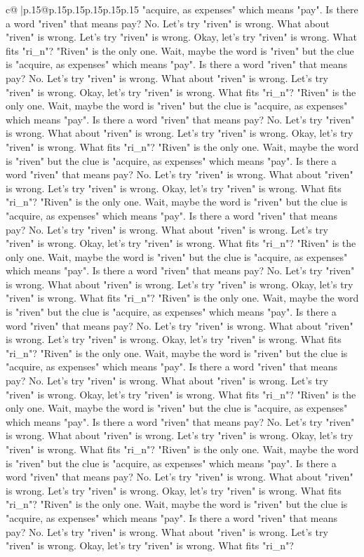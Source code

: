 \documentclass{article}
\begin{document}
{\begin{supertabular}{c@{$\;$}|p{.15\linewidth}@{}p{.15\linewidth}p{.15\linewidth}p{.15\linewidth}p{.15\linewidth}p{.15\linewidth}}
{{{"acquire, as expenses" which means "pay". Is there a word "riven" that means pay? No. Let's try "riven" is wrong. What about "riven" is wrong. Let's try "riven" is wrong. Okay, let's try "riven" is wrong. What fits "ri\_n"? "Riven" is the only one. Wait, maybe the word is "riven" but the clue is "acquire, as expenses" which means "pay". Is there a word "riven" that means pay? No. Let's try "riven" is wrong. What about "riven" is wrong. Let's try "riven" is wrong. Okay, let's try "riven" is wrong. What fits "ri\_n"? "Riven" is the only one. Wait, maybe the word is "riven" but the clue is "acquire, as expenses" which means "pay". Is there a word "riven" that means pay? No. Let's try "riven" is wrong. What about "riven" is wrong. Let's try "riven" is wrong. Okay, let's try "riven" is wrong. What fits "ri\_n"? "Riven" is the only one. Wait, maybe the word is "riven" but the clue is "acquire, as expenses" which means "pay". Is there a word "riven" that means pay? No. Let's try "riven" is wrong. What about "riven" is wrong. Let's try "riven" is wrong. Okay, let's try "riven" is wrong. What fits "ri\_n"? "Riven" is the only one. Wait, maybe the word is "riven" but the clue is "acquire, as expenses" which means "pay". Is there a word "riven" that means pay? No. Let's try "riven" is wrong. What about "riven" is wrong. Let's try "riven" is wrong. Okay, let's try "riven" is wrong. What fits "ri\_n"? "Riven" is the only one. Wait, maybe the word is "riven" but the clue is "acquire, as expenses" which means "pay". Is there a word "riven" that means pay? No. Let's try "riven" is wrong. What about "riven" is wrong. Let's try "riven" is wrong. Okay, let's try "riven" is wrong. What fits "ri\_n"? "Riven" is the only one. Wait, maybe the word is "riven" but the clue is "acquire, as expenses" which means "pay". Is there a word "riven" that means pay? No. Let's try "riven" is wrong. What about "riven" is wrong. Let's try "riven" is wrong. Okay, let's try "riven" is wrong. What fits "ri\_n"? "Riven" is the only one. Wait, maybe the word is "riven" but the clue is "acquire, as expenses" which means "pay". Is there a word "riven" that means pay? No. Let's try "riven" is wrong. What about "riven" is wrong. Let's try "riven" is wrong. Okay, let's try "riven" is wrong. What fits "ri\_n"? "Riven" is the only one. Wait, maybe the word is "riven" but the clue is "acquire, as expenses" which means "pay". Is there a word "riven" that means pay? No. Let's try "riven" is wrong. What about "riven" is wrong. Let's try "riven" is wrong. Okay, let's try "riven" is wrong. What fits "ri\_n"? "Riven" is the only one. Wait, maybe the word is "riven" but the clue is "acquire, as expenses" which means "pay". Is there a word "riven" that means pay? No. Let's try "riven" is wrong. What about "riven" is wrong. Let's try "riven" is wrong. Okay, let's try "riven" is wrong. What fits "ri\_n"? "Riven" is the only one. Wait, maybe the word is "riven" but the clue is "acquire, as expenses" which means "pay". Is there a word "riven" that means pay? No. Let's try "riven" is wrong. What about "riven" is wrong. Let's try "riven" is wrong. Okay, let's try "riven" is wrong. What fits "ri\_n"? }}}
\end{supertabular}}
\end{document}
